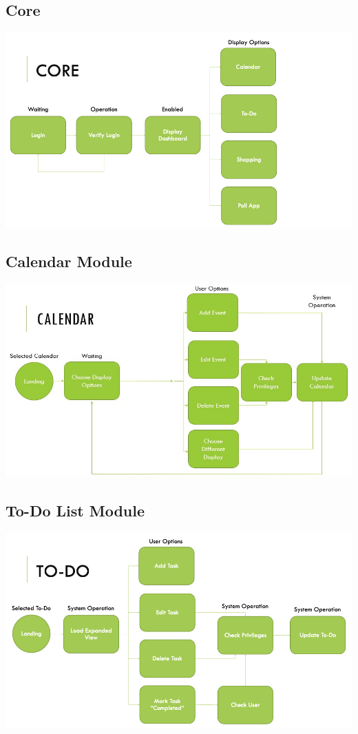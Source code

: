 \documentclass[12pt]{article}
\begin{document}
\subsection{Core}
\includegraphics[scale=0.45]{CSC450_Design.001.jpeg}
\subsection{Calendar Module}
\includegraphics[scale= 0.65]{CSC450_Design.002.jpeg}
\subsection{To-Do List Module}
\includegraphics[scale=0.45]{CSC450_Design.003.jpeg}
\end{document}
